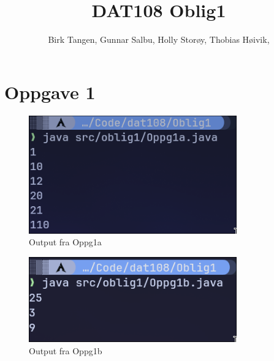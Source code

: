
\usepackage{graphicx}   %
\usepackage{float}      %

\title{\huge{DAT108 Oblig1}}
\author{\LARGE{Birk Tangen, Gunnar Salbu, Holly Storøy, Thobias Høivik, }}
\date{}



\maketitle

\newpage
\tableofcontents

\newpage
\section{Oppgave 1}

\begin{figure}[H]   %
    \centering
    \includegraphics[width=0.8\textwidth]{./bilder/Oppg1a.png}
    \caption{Output fra Oppg1a}
\end{figure}

\begin{figure}[H]   %
    \centering
    \includegraphics[width=0.8\textwidth]{./bilder/Oppg1b.png}
    \caption{Output fra Oppg1b}
\end{figure}

\newpage 
